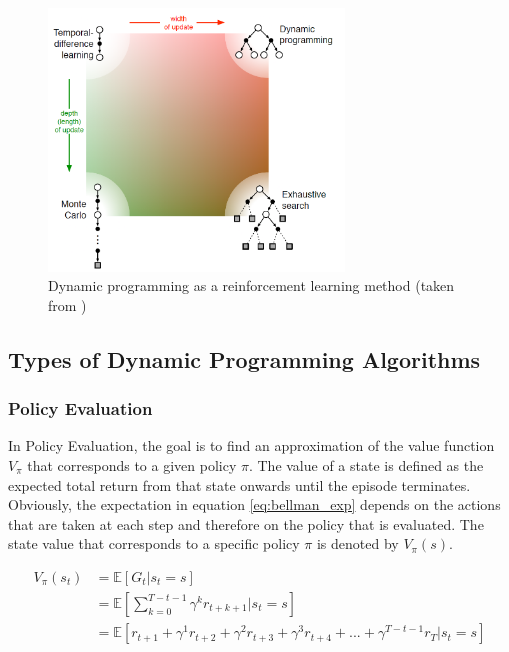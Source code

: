 \begin{figure}
	\centering
	\includegraphics[width=0.7\textwidth]{src/pics/RL_spectrum.png}
	\caption{Dynamic programming as a reinforcement learning method (taken from \cite{SuttonBarto2018})}
	\label{fig:dp_in_rl}
\end{figure}

\subsection{Types of Dynamic Programming Algorithms}

\subsubsection{Policy Evaluation}
\label{subsection:policy_evaluation}

In Policy Evaluation, the goal is to find an approximation of the value function $V_\pi$ that corresponds to a given policy $\pi$. The value of a state is defined as the expected total return from that state onwards until the episode terminates. Obviously, the expectation in equation \ref{eq:bellman_exp} depends on the actions that are taken at each step and therefore on the policy that is evaluated. The state value that corresponds to a specific policy $\pi$ is denoted by $V_\pi(s)$.

\begin{align}
V_\pi(s_t)&=\mathbb{E}[G_t|s_t=s]\\ &= \mathbb{E}\left[ \sum_{k=0}^{T-t-1}\gamma^k r_{t+k+1}|s_t=s\right] \\
&=\mathbb{E}[r_{t+1}+\gamma^1 r_{t+2}+\gamma^2 r_{t+3}+\gamma^3 r_{t+4}+...+\gamma^{T-t-1}r_T|s_t=s]
\label{eq:bellman_exp}
\end{align}

